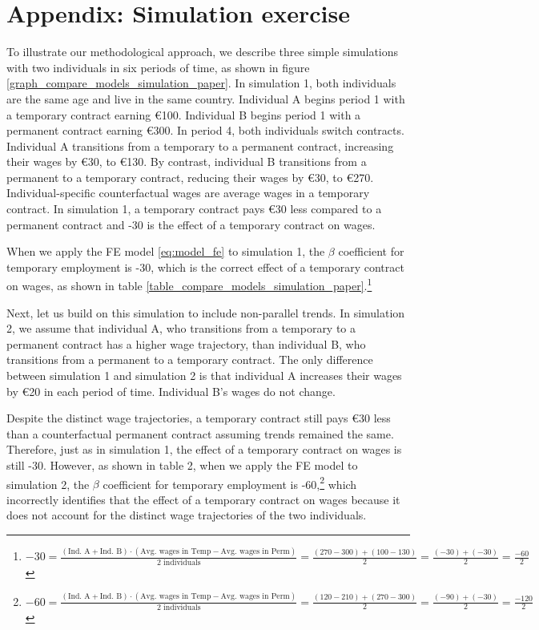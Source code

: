 \section{Appendix: Simulation exercise}\label{sec:simulation}
\setcounter{figure}{0}    
\setcounter{table}{0}    
\renewcommand*\thetable{\Alph{section}.\arabic{table}}
\renewcommand*\thefigure{\Alph{section}.\arabic{figure}}
\renewcommand{\theHfigure}{\Alph{section}.\arabic{table}}
\renewcommand{\theHtable}{\Alph{section}.\arabic{figure}}

To illustrate our methodological approach, we describe three simple simulations with two individuals in six periods of time, as shown in figure \ref{graph_compare_models_simulation_paper}. In simulation 1, both individuals are the same age and live in the same country. Individual A begins period 1 with a temporary contract earning €100. Individual B begins period 1 with a permanent contract earning €300. In period 4, both individuals switch contracts. Individual A transitions from a temporary to a permanent contract, increasing their wages by €30, to €130. By contrast, individual B transitions from a permanent to a temporary contract, reducing their wages by €30, to €270. Individual-specific counterfactual wages are average wages in a temporary contract. In simulation 1, a temporary contract pays €30 less compared to a permanent contract and -30 is the effect of a temporary contract on wages.

When we apply the FE model \ref{eq:model_fe} to simulation 1, the $\beta$ coefficient for temporary employment is -30, which is the correct effect of a temporary contract on wages, as shown in table \ref{table_compare_models_simulation_paper}.\footnote{$-30 = \frac{(\text{Ind. A} + \text{Ind. B}) \cdot (\text{Avg. wages in Temp} - \text{Avg. wages in Perm})}{2 \text{ individuals}} = \frac{(270-300) + (100-130)}{2} = \frac{(-30) + (-30)}{2} = \frac{-60}{2}$}

Next, let us build on this simulation to include non-parallel trends.  In simulation 2, we assume that individual A, who transitions from a temporary to a permanent contract has a higher wage trajectory, than individual B, who transitions from a permanent to a temporary contract.  The only difference between simulation 1 and simulation 2 is that individual A increases their wages by €20 in each period of time.  Individual B's wages do not change.

Despite the distinct wage trajectories, a temporary contract still pays €30 less than a counterfactual permanent contract assuming trends remained the same.  Therefore, just as in simulation 1, the effect of a temporary contract on wages is still -30.  However, as shown in table 2, when we apply the FE model to simulation 2, the $\beta$  coefficient for temporary employment is -60,\footnote{$-60 = \frac{(\text{Ind. A} + \text{Ind. B}) \cdot (\text{Avg. wages in Temp} - \text{Avg. wages in Perm})}{2 \text{ individuals}} = \frac{(120-210) + (270-300)}{2} = \frac{(-90) + (-30)}{2} = \frac{-120}{2}$} which incorrectly identifies that the effect of a temporary contract on wages because it does not account for the distinct wage trajectories of the two individuals.  

